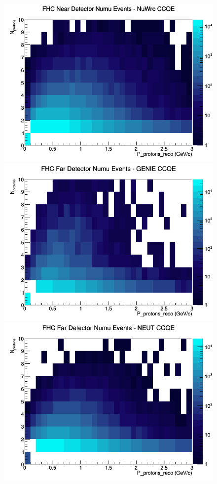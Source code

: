 \begin{figure}[h]
\includegraphics[width=\linewidth]{eff_N_P/GAr/protons/CCQE_FHC_ND_numu_N_P_NuWro.png}
\endminipage
\newline
{}
\includegraphics[width=\linewidth]{eff_N_P/GAr/protons/CCQE_FHC_FD_numu_N_P_GENIE.png}
\endminipage
{}
\includegraphics[width=\linewidth]{eff_N_P/GAr/protons/CCQE_FHC_FD_numu_N_P_NEUT.png}

\end{figure}
